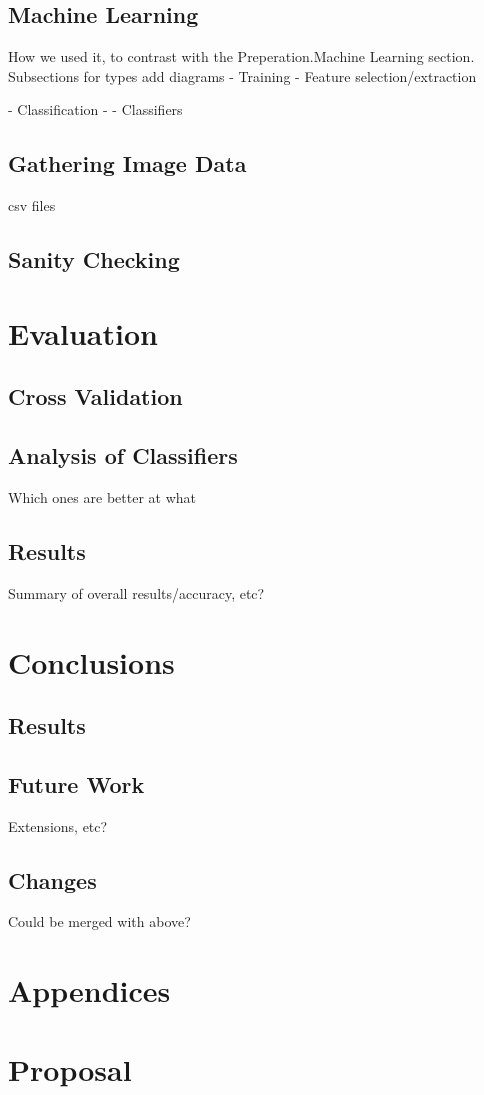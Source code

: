 \documentclass[14]{report}
\begin{document}
\section{Machine Learning}
How we used it, to contrast with the Preperation.Machine Learning section.
Subsections for types
add diagrams
- Training
- Feature selection/extraction

- Classification
- - Classifiers

\section{Gathering Image Data}
csv files

\section{Sanity Checking}

\chapter{Evaluation}

\section{Cross Validation}

\section{Analysis of Classifiers}
Which ones are better at what \cite{x} %

\section{Results}
Summary of overall results/accuracy, etc?
\chapter{Conclusions}

\section{Results}

\section{Future Work}
Extensions, etc?

\section{Changes}
Could be merged with above?


{}

\chapter{Appendices}

\chapter{Proposal}
\end{document}
